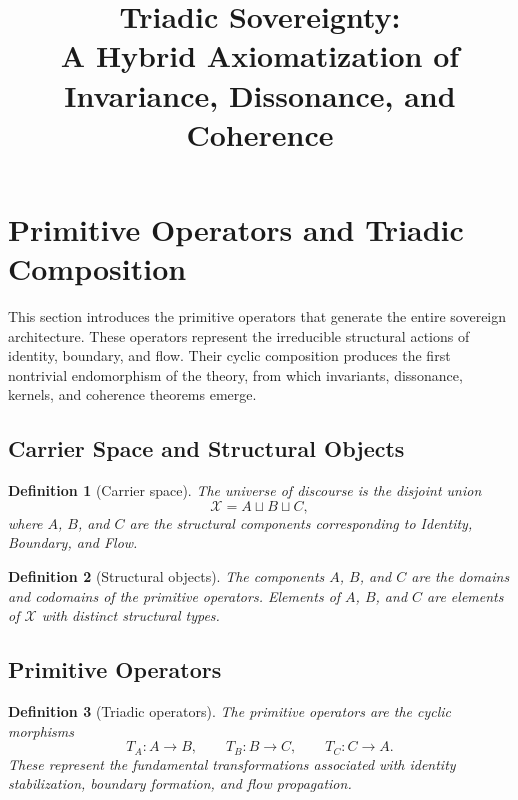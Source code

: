 \documentclass[12pt]{article}
\title{Triadic Sovereignty:\\
A Hybrid Axiomatization of Invariance, Dissonance, and Coherence}
\author{}
\date{}
\newtheorem{definition}{Definition}
\begin{document}
\maketitle
\tableofcontents

\section{Primitive Operators and Triadic Composition}

This section introduces the primitive operators that generate the entire
sovereign architecture. These operators represent the irreducible
structural actions of identity, boundary, and flow. Their cyclic
composition produces the first nontrivial endomorphism of the theory,
from which invariants, dissonance, kernels, and coherence theorems
emerge.

\subsection{Carrier Space and Structural Objects}

\begin{definition}[Carrier space]
The universe of discourse is the disjoint union
\[
\mathcal{X} = A \sqcup B \sqcup C,
\]
where $A$, $B$, and $C$ are the structural components corresponding to
Identity, Boundary, and Flow.
\end{definition}

\begin{definition}[Structural objects]
The components $A$, $B$, and $C$ are the domains and codomains of the
primitive operators. Elements of $A$, $B$, and $C$ are elements of
$\mathcal{X}$ with distinct structural types.
\end{definition}

\subsection{Primitive Operators}

\begin{definition}[Triadic operators]
The primitive operators are the cyclic morphisms
\[
T_A:A\to B,\qquad
T_B:B\to C,\qquad
T_C:C\to A.
\]
These represent the fundamental transformations associated with identity
stabilization, boundary formation, and flow propagation.
\end{definition}
\end{document}
